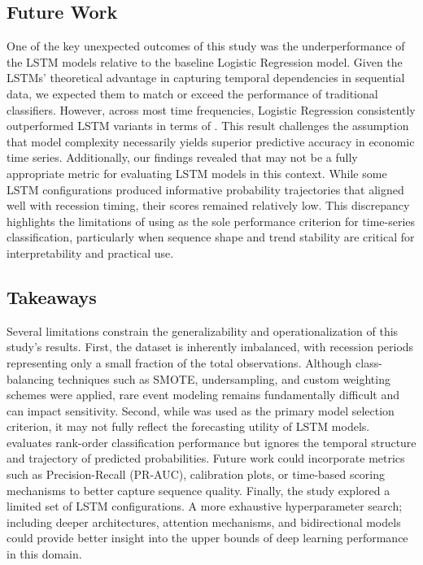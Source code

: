 \subsection{Future Work}

One of the key unexpected outcomes of this study was the underperformance of the LSTM models relative to the baseline Logistic Regression model. Given the LSTMs’ theoretical advantage in capturing temporal dependencies in sequential data, we expected them to match or exceed the performance of traditional classifiers. However, across most time frequencies, Logistic Regression consistently outperformed LSTM variants in terms of \AUCone. This result challenges the assumption that model complexity necessarily yields superior predictive accuracy in economic time series. Additionally, our findings revealed that \AUCone may not be a fully appropriate metric for evaluating LSTM models in this context. While some LSTM configurations produced informative probability trajectories that aligned well with recession timing, their \AUCtwo scores remained relatively low. This discrepancy highlights the limitations of using \AUCone as the sole performance criterion for time-series classification, particularly when sequence shape and trend stability are critical for interpretability and practical use.


\subsection{Takeaways}

Several limitations constrain the generalizability and operationalization of this study’s results. First, the dataset is inherently imbalanced, with recession periods representing only a small fraction of the total observations. Although class-balancing techniques such as SMOTE, undersampling, and custom weighting schemes were applied, rare event modeling remains fundamentally difficult and can impact sensitivity. Second, while \AUCone was used as the primary model selection criterion, it may not fully reflect the forecasting utility of LSTM models. \AUCtwo evaluates rank-order classification performance but ignores the temporal structure and trajectory of predicted probabilities. Future work could incorporate metrics such as Precision-Recall \AUCtwo (PR-AUC), calibration plots, or time-based scoring mechanisms to better capture sequence quality. Finally, the study explored a limited set of LSTM configurations. A more exhaustive hyperparameter search; including deeper architectures, attention mechanisms, and bidirectional models could provide better insight into the upper bounds of deep learning performance in this domain.






